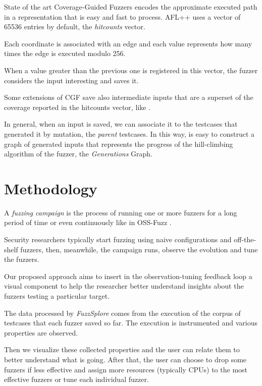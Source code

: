 \documentclass[conference,compsoc]{IEEEtran}
\begin{document}
State of the art Coverage-Guided Fuzzers encodes the approximate executed path in a representation that is easy and fast to process.
{\sc AFL++} uses a vector of 65536 entries by default, the {\it hitcounts} vector.

Each coordinate is associated with an edge and each value represents how many times the edge is executed modulo 256.

When a value greater than the previous one is registered in this vector, the fuzzer considers the input interesting and saves it.

Some extensions of CGF save also intermediate inputs that are a superset of the coverage reported in the hitcounts vector, like \cite{lafintel} \cite{ijon} \cite{besensitive}.

In general, when an input is saved, we can associate it to the testcases that generated it by mutation, the {\it parent} testcases. In this way, is easy to construct a graph of generated inputs that represents the progress of the hill-climbing algorithm of the fuzzer, the {\it Generations} Graph.


\section{Methodology}

A {\em fuzzing campaign} is the process of running one or more fuzzers for a long period of time or even continuously like in OSS-Fuzz \cite{serebryany2017oss}.

Security researchers typically start fuzzing using naive configurations and off-the-shelf fuzzers, then, meanwhile, the campaign runs, observe the evolution and tune the fuzzers.

Our proposed approach aims to insert in the observation-tuning feedback loop a visual component to help the researcher better understand insights about the fuzzers testing a particular target.

The data processed by {\em FuzzSplore} comes from the execution of the corpus of testcases that each fuzzer saved so far. The execution is instrumented and various properties are observed.

Then we visualize these collected properties and the user can relate them to better understand what is going. After that, the user can choose to drop some fuzzers if less effective and assign more resources (typically CPUs) to the most effective fuzzers or tune each individual fuzzer.
\end{document}
